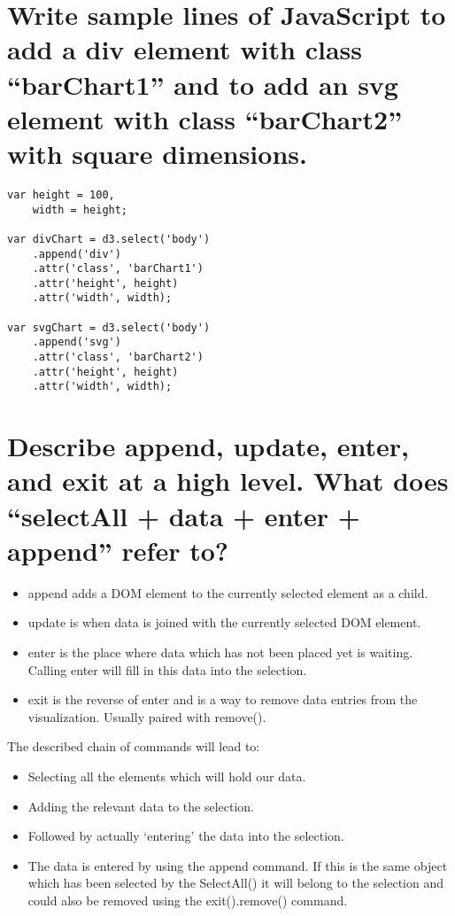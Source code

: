 \documentclass[a4paper]{scrartcl}
\begin{document}
\section{Write sample lines of JavaScript to add a div element with class “barChart1” and to add an svg element with class “barChart2” with square dimensions.}

\begin{lstlisting}
var height = 100,
    width = height;

var divChart = d3.select('body')
    .append('div')
    .attr('class', 'barChart1')
    .attr('height', height)
    .attr('width', width);

var svgChart = d3.select('body')
    .append('svg')
    .attr('class', 'barChart2')
    .attr('height', height)
    .attr('width', width);
\end{lstlisting}

\section{Describe append, update, enter, and exit at a high level. What does “selectAll + data + enter + append” refer to?}
\begin{itemize}
    \item append adds a DOM element to the currently selected element as a child.
    \item update is when data is joined with the currently selected DOM element.
    \item enter is the place where data which has not been placed yet is waiting. Calling enter will fill in this data into the selection.
    \item exit is the reverse of enter and is a way to remove data entries from the visualization. Usually paired with remove().
\end{itemize}

The described chain of commands will lead to:
\begin{itemize}
    \item Selecting all the elements which will hold our data.
    \item Adding the relevant data to the selection.
    \item Followed by actually `entering' the data into the selection.
    \item The data is entered by using the append command. If this is the same object which has been selected by the SelectAll() it will belong to the selection and could also be removed using the exit().remove() command.
\end{itemize}
\end{document}

